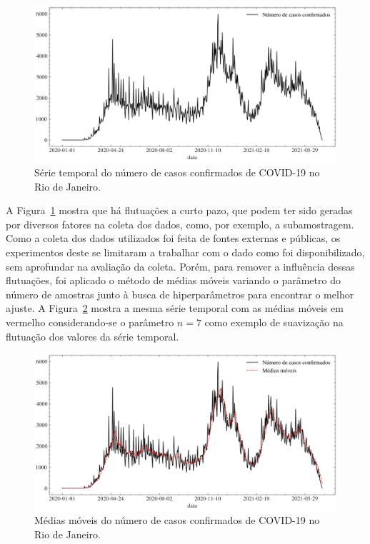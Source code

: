 \begin{figure}[!htp]
    \centering
    \includegraphics[width=5.0in]{img/casos_confirmados.pdf}
    \caption{Série temporal do número de casos confirmados de COVID-19 no Rio de Janeiro.}\label{fig:casos_confirmados}
\end{figure}

A Figura~\ref{fig:casos_confirmados} mostra que há flutuações a curto pazo, que podem ter sido geradas por diversos fatores na coleta dos dados, como, por exemplo, a subamostragem. Como a coleta dos dados utilizados foi feita de fontes externas e públicas, os experimentos deste se limitaram a trabalhar com o dado como foi disponibilizado, sem aprofundar na avaliação da coleta. Porém, para remover a influência dessas flutuações, foi aplicado o método de médias móveis variando o parâmetro do número de amostras junto à busca de hiperparâmetros para encontrar o melhor ajuste. A Figura~\ref{fig:casos_confirmados_ma} mostra a mesma série temporal com as médias móveis em vermelho considerando-se o parâmetro $n=7$ como exemplo de suavização na flutuação dos valores da série temporal.

\begin{figure}[!htp]
    \centering
    \includegraphics[width=5.0in]{img/casos_confirmados_ma.pdf}
    \caption{Médias móveis do número de casos confirmados de COVID-19 no Rio de Janeiro.}\label{fig:casos_confirmados_ma}
\end{figure}

